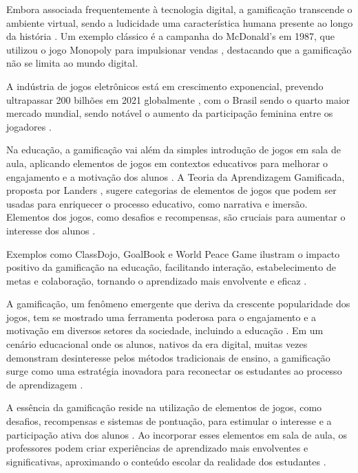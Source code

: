 Embora associada frequentemente à tecnologia digital, a gamificação transcende o ambiente virtual, sendo a ludicidade uma característica humana presente ao longo da história \cite{santaella2007}. Um exemplo clássico é a campanha do McDonald's em 1987, que utilizou o jogo Monopoly para impulsionar vendas \cite{chou}, destacando que a gamificação não se limita ao mundo digital.

A indústria de jogos eletrônicos está em crescimento exponencial, prevendo ultrapassar 200 bilhões em 2021 globalmente \cite{digicapital}, com o Brasil sendo o quarto maior mercado mundial, sendo notável o aumento da participação feminina entre os jogadores \cite{agenciafirma}.

Na educação, a gamificação vai além da simples introdução de jogos em sala de aula, aplicando elementos de jogos em contextos educativos para melhorar o engajamento e a motivação dos alunos \cite{landers2014}. A Teoria da Aprendizagem Gamificada, proposta por Landers \cite{landers2014}, sugere categorias de elementos de jogos que podem ser usadas para enriquecer o processo educativo, como narrativa e imersão. Elementos dos jogos, como desafios e recompensas, são cruciais para aumentar o interesse dos alunos \cite{elias2012}.

Exemplos como ClassDojo, GoalBook e World Peace Game ilustram o impacto positivo da gamificação na educação, facilitando interação, estabelecimento de metas e colaboração, tornando o aprendizado mais envolvente e eficaz \cite{landers2017}.

A gamificação, um fenômeno emergente que deriva da crescente popularidade dos jogos, tem se mostrado uma ferramenta poderosa para o engajamento e a motivação em diversos setores da sociedade, incluindo a educação \cite{alves2014gamificacao}. Em um cenário educacional onde os alunos, nativos da era digital, muitas vezes demonstram desinteresse pelos métodos tradicionais de ensino, a gamificação surge como uma estratégia inovadora para reconectar os estudantes ao processo de aprendizagem \cite{alves2014gamificacao}.

A essência da gamificação reside na utilização de elementos de jogos, como desafios, recompensas e sistemas de pontuação, para estimular o interesse e a participação ativa dos alunos \cite{kapp2012gamification}. Ao incorporar esses elementos em sala de aula, os professores podem criar experiências de aprendizado mais envolventes e significativas, aproximando o conteúdo escolar da realidade dos estudantes \cite{tolomei2017gamificacao}.

